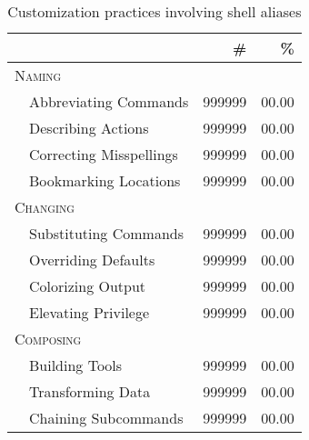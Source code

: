 \begin{table}
	\caption{Customization practices involving shell aliases}
    \label{tab:practices}
    \begin{tabular}{llrr}
        \toprule
        & & \# & \% \\
        \midrule
        \multicolumn{2}{l}{\textsc{Naming}} & & \\
        & Abbreviating Commands     & \num{999999} & 00.00 \\ %
        & Describing Actions        & \num{999999} & 00.00 \\ %
        & Correcting Misspellings   & \num{999999} & 00.00 \\ %
        & Bookmarking Locations     & \num{999999} & 00.00 \\
        \midrule
        \multicolumn{2}{l}{\textsc{Changing}} & & \\
        & Substituting Commands     & \num{999999} & 00.00 \\ %
        & Overriding Defaults       & \num{999999} & 00.00 \\ %
        & Colorizing Output         & \num{999999} & 00.00 \\ %
        & Elevating Privilege       & \num{999999} & 00.00 \\ %
        \midrule
        \multicolumn{2}{l}{\textsc{Composing}} & & \\
        & Building Tools            & \num{999999} & 00.00 \\ %
        & Transforming Data         & \num{999999} & 00.00 \\ %
        & Chaining Subcommands      & \num{999999} & 00.00 \\ %
        \bottomrule
        \end{tabular}
\end{table}